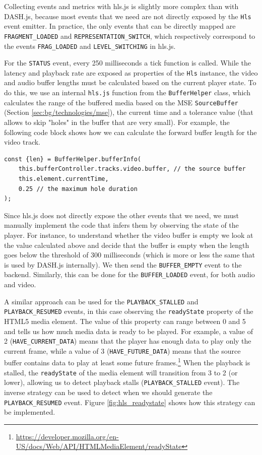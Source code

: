 Collecting events and metrics with hls.js is slightly more complex than with DASH.js, because most events that we need are not directly exposed by the \texttt{Hls} event emitter. In practice, the only events that can be directly mapped are \texttt{FRAGMENT\_LOADED} and \texttt{REPRESENTATION\_SWITCH}, which respectively correspond to the events \texttt{FRAG\_LOADED} and \texttt{LEVEL\_SWITCHING} in hls.js.

For the \texttt{STATUS} event, every 250 milliseconds a tick function is called. While the latency and playback rate are exposed as properties of the \texttt{Hls} instance, the video and audio buffer lengths must be calculated based on the current player state. To do this, we use an internal \texttt{hls.js} function from the \texttt{BufferHelper} class, which calculates the range of the buffered media based on the MSE \texttt{SourceBuffer} (Section \ref{sec:bg/technologies/mse}), the current time and a tolerance value (that allows to skip "holes" in the buffer that are very small). For example, the following code block shows how we can calculate the forward buffer length for the video track.

\begin{verbatim}
const {len} = BufferHelper.bufferInfo(
    this.bufferController.tracks.video.buffer, // the source buffer
    this.element.currentTime,
    0.25 // the maximum hole duration
);
\end{verbatim}

Since hls.js does not directly expose the other events that we need, we must manually implement the code that infers them by observing the state of the player. For instance, to understand whether the video buffer is empty we look at the value calculated above and decide that the buffer is empty when the length goes below the threshold of 300 milliseconds (which is more or less the same that is used by DASH.js internally). We then send the \texttt{BUFFER\_EMPTY} event to the backend. Similarly, this can be done for the \texttt{BUFFER\_LOADED} event, for both audio and video.

A similar approach can be used for the \texttt{PLAYBACK\_STALLED} and \texttt{PLAYBACK\_RESUMED} events, in this case observing the \texttt{readyState} property of the HTML5 media element. The value of this property can range between 0 and 5 and tells us how much media data is ready to be played. For example, a value of 2 (\texttt{HAVE\_CURRENT\_DATA}) means that the player has enough data to play only the current frame, while a value of 3 (\texttt{HAVE\_FUTURE\_DATA}) means that the source buffer contains data to play at least some future frames.\footnote{\url{https://developer.mozilla.org/en-US/docs/Web/API/HTMLMediaElement/readyState}} When the playback is stalled, the \texttt{readyState} of the media element will transition from 3 to 2 (or lower), allowing us to detect playback stalls (\texttt{PLAYBACK\_STALLED} event). The inverse strategy can be used to detect when we should generate the \texttt{PLAYBACK\_RESUMED} event. Figure \ref{fig:hls_readystate} shows how this strategy can be implemented.

